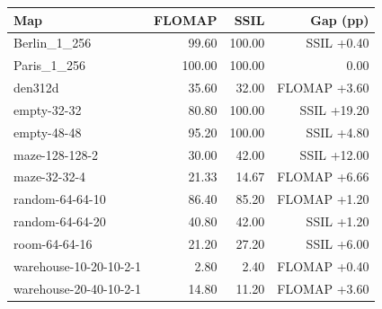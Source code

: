 \scriptsize
\setlength{\tabcolsep}{4pt}
\begin{tabular}{lrrr}
\toprule
Map & FLOMAP & SSIL & Gap (pp) \\
\midrule
Berlin\_1\_256 & 99.60 & 100.00 & SSIL +0.40 \\
Paris\_1\_256 & 100.00 & 100.00 & 0.00 \\
den312d & 35.60 & 32.00 & FLOMAP +3.60 \\
empty-32-32 & 80.80 & 100.00 & SSIL +19.20 \\
empty-48-48 & 95.20 & 100.00 & SSIL +4.80 \\
maze-128-128-2 & 30.00 & 42.00 & SSIL +12.00 \\
maze-32-32-4 & 21.33 & 14.67 & FLOMAP +6.66 \\
random-64-64-10 & 86.40 & 85.20 & FLOMAP +1.20 \\
random-64-64-20 & 40.80 & 42.00 & SSIL +1.20 \\
room-64-64-16 & 21.20 & 27.20 & SSIL +6.00 \\
warehouse-10-20-10-2-1 & 2.80 & 2.40 & FLOMAP +0.40 \\
warehouse-20-40-10-2-1 & 14.80 & 11.20 & FLOMAP +3.60 \\
\bottomrule
\end{tabular}
